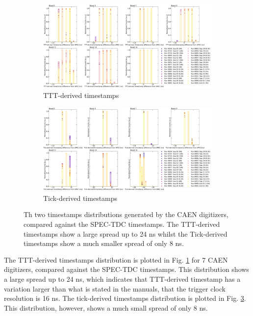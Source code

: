 \begin{figure}[htbp!]

\begin{subfigure}[h]{1.00\linewidth}
\centering    
\includegraphics[width=\linewidth]{TTTts_spec}
\caption{TTT-derived timestamps}
\label{subfig:TTTts_spec}
\end{subfigure}

\hfill
\begin{subfigure}[h]{1.00\linewidth}
\centering    
\includegraphics[width=\linewidth]{Tickts_spec}
\caption{Tick-derived timestamps}
\label{subfig:Tickts_spec}
\end{subfigure}%

\caption{
Th two timestamps distributions generated by the CAEN digitizers, compared against the SPEC-TDC timestamps.
The TTT-derived timestamps show a large spread up to 24 ns whilst the Tick-derived timestamps show a much smaller spread of only 8 ns.
}
\end{figure}

The TTT-derived timestamps distribution is plotted in Fig. \ref {subfig:TTTts_spec} for 7 CAEN digitizers, compared against the SPEC-TDC timestamps.
This distribution shows a large spread up to 24 ns, which indicates that TTT-derived timestamp has a variation larger than what is stated in the manuals, that the trigger clock resolution is 16 ns.
The tick-derived timestamps distribution is plotted in Fig. \ref {subfig:Tickts_spec}.
This distribution, however, shows a much small spread of only 8 ns.

